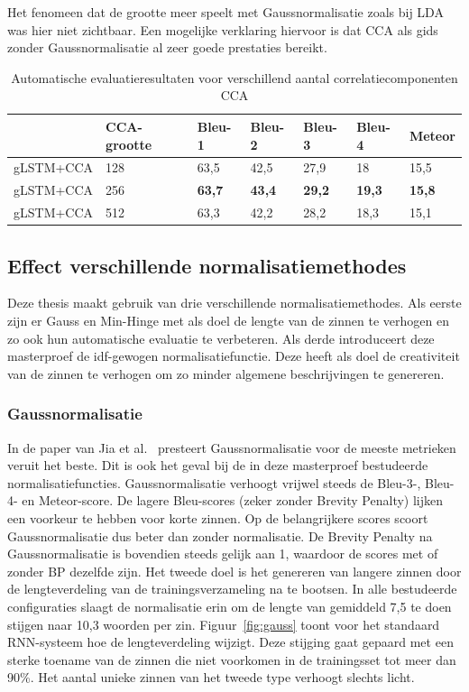 Het fenomeen dat de grootte meer speelt met Gaussnormalisatie zoals bij LDA was hier niet zichtbaar. Een mogelijke verklaring hiervoor is dat CCA als gids zonder Gaussnormalisatie al zeer goede prestaties bereikt.
\begin{table}
	\centering
	\begin{tabular}{lllllll}
		~              & CCA-grootte     & Bleu-1 & Bleu-2 & Bleu-3 & Bleu-4 & Meteor \\ \hline
		gLSTM+CCA & 128        & 63,5   & 42,5 			& 27,9   & 18   & 15,5  \\
		gLSTM+CCA & 256        & \textbf{63,7}   & \textbf{43,4}   & \textbf{29,2}   & \textbf{19,3}   & \textbf{15,8}  \\
		gLSTM+CCA & 512        & 63,3   & 42,2   & 28,2   & 18,3 & 15,1  \\ \hline
	
	\end{tabular}

	\caption{Automatische evaluatieresultaten voor verschillend aantal correlatiecomponenten CCA}
		\label{table:results_cca}
\end{table}



\subsection{Effect verschillende normalisatiemethodes}
Deze thesis maakt gebruik van drie verschillende normalisatiemethodes. Als eerste zijn er Gauss en Min-Hinge met als doel de lengte van de zinnen te verhogen en zo ook hun automatische evaluatie te verbeteren. Als derde introduceert deze masterproef de idf-gewogen normalisatiefunctie. Deze heeft als doel de creativiteit van de zinnen te verhogen om zo minder algemene beschrijvingen te genereren.

\subsubsection{Gaussnormalisatie}
In de paper van Jia et al.~\cite{Fernando2015} presteert Gaussnormalisatie voor de meeste metrieken veruit het beste. 
Dit is ook het geval bij de in deze masterproef bestudeerde normalisatiefuncties. Gaussnormalisatie verhoogt vrijwel steeds de Bleu-3-, Bleu-4- en Meteor-score. De lagere Bleu-scores (zeker zonder Brevity Penalty) lijken een voorkeur te hebben voor korte zinnen. Op de belangrijkere scores scoort Gaussnormalisatie dus beter dan zonder normalisatie. De Brevity Penalty na Gaussnormalisatie is bovendien steeds gelijk aan 1, waardoor de scores met of zonder BP dezelfde zijn.
Het tweede doel is het genereren van langere zinnen door de lengteverdeling van de trainingsverzameling na te bootsen.
In alle bestudeerde configuraties slaagt de normalisatie erin om de lengte van gemiddeld 7,5 te doen stijgen naar 10,3 woorden per zin. Figuur~\ref{fig:gauss} toont voor het standaard RNN-systeem hoe de lengteverdeling wijzigt. Deze stijging gaat gepaard met een sterke toename van de zinnen die niet voorkomen in de trainingsset tot meer dan 90\%. Het aantal unieke zinnen van het tweede type verhoogt slechts licht. 

